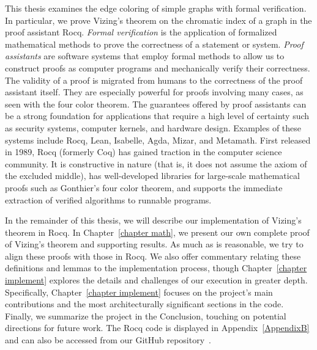 This thesis examines the edge coloring of simple graphs with formal verification. In particular, we prove Vizing's theorem on the chromatic index of a graph in the proof assistant Rocq. \textit{Formal verification} is the application of formalized mathematical methods to prove the correctness of a statement or system. \textit{Proof assistants} are software systems that employ formal methods to allow us to construct proofs as computer programs and mechanically verify their correctness. The validity of a proof is migrated from humans to the correctness of the proof assistant itself. They are especially powerful for proofs involving many cases, as seen with the four color theorem. The guarantees offered by proof assistants can be a strong foundation for applications that require a high level of certainty such as security systems, computer kernels, and hardware design. Examples of these systems include Rocq, Lean, Isabelle, Agda, Mizar, and Metamath. First released in 1989, Rocq (formerly Coq) has gained traction in the computer science community. It is constructive in nature (that is, it does not assume the axiom of the excluded middle), has well-developed libraries for large-scale mathematical proofs such as Gonthier's four color theorem, and supports the immediate extraction of verified algorithms to runnable programs. 

In the remainder of this thesis, we will describe our implementation of Vizing's theorem in Rocq. In Chapter~\ref{chapter math}, we present our own complete proof of Vizing's theorem and supporting results. As much as is reasonable, we try to align these proofs with those in Rocq. We also offer commentary relating these definitions and lemmas to the implementation process, though Chapter~\ref{chapter implement} explores the details and challenges of our execution in greater depth. Specifically, Chapter~\ref{chapter implement} focuses on the project's main contributions and the most architecturally significant sections in the code. Finally, we summarize the project in the Conclusion, touching on potential directions for future work. The Rocq code is displayed in Appendix~\ref{AppendixB} and can also be accessed from our GitHub repository~\cite{my_code}.

